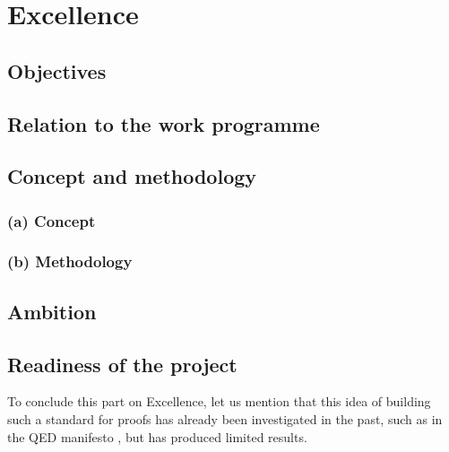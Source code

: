 \chapter{Excellence}



\section{Objectives}\label{objectives}



\section{Relation to the work programme}



\section{Concept and methodology}

\newcommand{\cmsection}[1]{\bigskip\par\noindent\stepcounter{cmsec}\currentpdfbookmark{--- #1}{\thecmsec}{\bf \large \underline{#1}}\medskip}

\subsection*{(a) Concept}\label{concept}



\subsection*{(b) Methodology}



\section{Ambition}




\section*{Readiness of the project}

To conclude this part on Excellence, let us mention that this idea of
building such a standard for proofs has already been investigated in
the past, such as in the QED manifesto \cite{Qed94}, but has produced
limited results.

